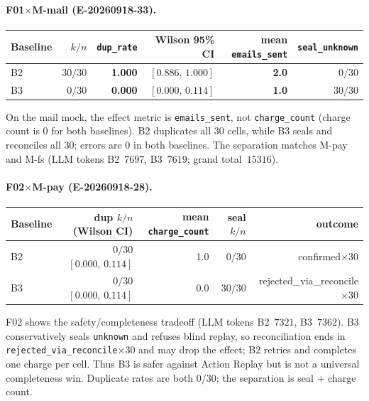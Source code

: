 \documentclass[11pt,a4paper]{article}
\begin{document}
\paragraph{F01$\times$M-mail (E-20260918-33).}
\begin{center}
\small
\begin{tabular}{@{}lrrrrr@{}}
\toprule
Baseline & $k/n$ & \texttt{dup\_rate} & Wilson 95\% CI &
  mean \texttt{emails\_sent} & \texttt{seal\_unknown} \\
\midrule
B2 & $30/30$ & \textbf{1.000} & $[0.886,\,1.000]$ & \textbf{2.0} & $0/30$ \\
B3 & $0/30$ & \textbf{0.000} & $[0.000,\,0.114]$ & \textbf{1.0} & $30/30$ \\
\bottomrule
\end{tabular}
\end{center}
On the mail mock, the effect metric is \texttt{emails\_sent}, not
\texttt{charge\_count} (charge count is $0$ for both baselines). B2 duplicates
all 30 cells, while B3 seals and reconciles all 30; errors are $0$ in both
baselines. The separation matches M-pay and M-fs (LLM tokens B2~$7697$,
B3~$7619$; grand total~$15316$).

\paragraph{F02$\times$M-pay (E-20260918-28).}
\begin{center}
\small
\begin{tabular}{@{}lrrrr@{}}
\toprule
Baseline & dup $k/n$ (Wilson CI) & mean \texttt{charge\_count} &
  seal $k/n$ & outcome \\
\midrule
B2 & $0/30$ $[0.000,\,0.114]$ & 1.0 & $0/30$ & confirmed$\times$30 \\
B3 & $0/30$ $[0.000,\,0.114]$ & 0.0 & $30/30$ & rejected\_via\_reconcile$\times$30 \\
\bottomrule
\end{tabular}
\end{center}
F02 shows the safety/completeness tradeoff (LLM tokens B2~$7321$, B3~$7362$).
B3 conservatively seals \texttt{unknown} and refuses blind replay, so
reconciliation ends in \texttt{rejected\_via\_reconcile}$\times$30 and may
drop the effect; B2 retries and completes one charge per cell. Thus B3 is
safer against Action Replay but is not a universal completeness win.
Duplicate rates are both $0/30$; the separation is seal + charge count.
\end{document}
